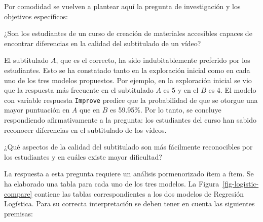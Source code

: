 \documentclass[
  12pt,
  a4paper,
  extrafontsizes,
  onecolumn,
  openright,
  table]{memoir}
\begin{document}
Por comodidad se vuelven a plantear aquí la pregunta de investigación y
los objetivos específicos:

\begin{tcolorbox}[enhanced jigsaw, colback=white, toptitle=1mm, opacityback=0, title=\textcolor{quarto-callout-note-color}{\faInfo}\hspace{0.5em}{Pregunta de investigación}, coltitle=black, bottomrule=.15mm, bottomtitle=1mm, colbacktitle=quarto-callout-note-color!10!white, toprule=.15mm, titlerule=0mm, left=2mm, breakable, colframe=quarto-callout-note-color-frame, rightrule=.15mm, arc=.35mm, opacitybacktitle=0.6, leftrule=.75mm]

¿Son los estudiantes de un curso de creación de materiales accesibles
capaces de encontrar diferencias en la calidad del subtitulado de un
vídeo?

\end{tcolorbox}

El subtitulado \(A\), que es el correcto, ha sido indubitablemente
preferido por los estudiantes. Esto se ha constatado tanto en la
exploración inicial como en cada uno de los tres modelos propuestos. Por
ejemplo, en la exploración inicial se vio que la respuesta más frecuente
en el subtitulado \(A\) es 5 y en el \(B\) es 4. El modelo con variable
respuesta \texttt{Improve} predice que la probabilidad de que se otorgue
una mayor puntuación en \(A\) que en \(B\) es 59.95\%. Por lo tanto, se
concluye respondiendo afirmativamente a la pregunta: los estudiantes del
curso han sabido reconocer diferencias en el subtitulado de los vídeos.

\begin{tcolorbox}[enhanced jigsaw, colback=white, toptitle=1mm, opacityback=0, title=\textcolor{quarto-callout-tip-color}{\faLightbulb}\hspace{0.5em}{Objetivos específicos}, coltitle=black, bottomrule=.15mm, bottomtitle=1mm, colbacktitle=quarto-callout-tip-color!10!white, toprule=.15mm, titlerule=0mm, left=2mm, breakable, colframe=quarto-callout-tip-color-frame, rightrule=.15mm, arc=.35mm, opacitybacktitle=0.6, leftrule=.75mm]

¿Qué aspectos de la calidad del subtitulado son más fácilmente
reconocibles por los estudiantes y en cuáles existe mayor dificultad?

\end{tcolorbox}

La respuesta a esta pregunta requiere un análisis pormenorizado ítem a
ítem. Se ha elaborado una tabla para cada uno de los tres modelos. La
Figura~\ref{fig-logistic-compare} contiene las tablas correspondientes a
los dos modelos de Regresión Logística. Para su correcta interpretación
se deben tener en cuenta las siguientes premisas:
\end{document}
